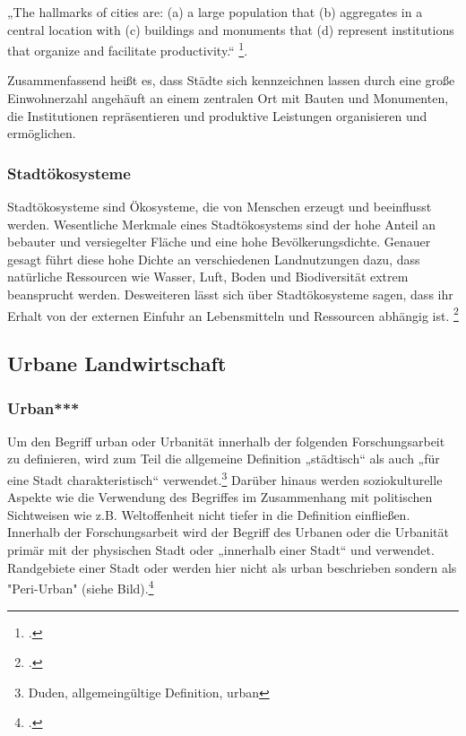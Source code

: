 \documentclass{scrartcl}
\begin{document}
\begin{displayquote} 
„The hallmarks of cities are: (a) a large population that (b) aggregates in a central location with (c) buildings and monuments that (d) represent institutions that organize and facilitate productivity.“ \footcite[S.16]{Elmqvist2013}. 
\end{displayquote}  Zusammenfassend heißt es, dass Städte sich kennzeichnen lassen durch eine große Einwohnerzahl angehäuft an einem zentralen Ort mit Bauten und Monumenten, die Institutionen repräsentieren und produktive Leistungen organisieren und ermöglichen.

\subsubsection{Stadtökosysteme}
Stadtökosysteme sind Ökosysteme, die von Menschen erzeugt und beeinflusst werden. Wesentliche Merkmale eines Stadtökosystems sind der hohe Anteil an bebauter und versiegelter Fläche und eine hohe Bevölkerungsdichte. Genauer gesagt führt diese hohe Dichte an verschiedenen Landnutzungen dazu, dass natürliche Ressourcen wie Wasser, Luft, Boden und Biodiversität extrem beansprucht werden. Desweiteren lässt sich über Stadtökosysteme sagen, dass ihr Erhalt von der externen Einfuhr an Lebensmitteln und Ressourcen abhängig ist.  \footcite[S.61]{Breuste2016Stadtokosysteme}


\subsection{Urbane Landwirtschaft}

\subsubsection{Urban***}
Um den Begriff urban oder Urbanität innerhalb der folgenden Forschungsarbeit zu definieren, wird zum Teil die allgemeine Definition „städtisch“ als auch „für eine Stadt charakteristisch“ verwendet.\footnote{Duden, allgemeingültige Definition, urban} Darüber hinaus werden soziokulturelle Aspekte wie die Verwendung des Begriffes im Zusammenhang mit politischen Sichtweisen wie z.B. Weltoffenheit nicht tiefer in die Definition einfließen. Innerhalb der Forschungsarbeit wird der Begriff des Urbanen oder die Urbanität primär mit der physischen Stadt oder „innerhalb einer Stadt“ und verwendet. Randgebiete einer Stadt oder werden hier nicht als urban beschrieben sondern als "Peri-Urban" (siehe Bild).\footcite[S. 140]{MullerUrbanStadt}
\end{document}
